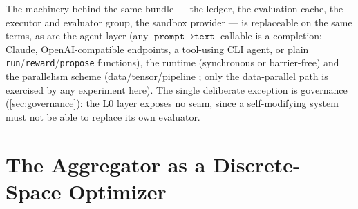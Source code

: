 \documentclass{article}
\newcommand{\code}[1]{\texttt{#1}}
\begin{document}
The machinery behind the same bundle --- the ledger, the evaluation cache, the executor and evaluator group, the sandbox provider --- is replaceable on the same terms, as are the agent layer (any $\code{prompt} \to \code{text}$ callable is a completion: Claude, OpenAI-compatible endpoints, a tool-using CLI agent, or plain \code{run}/\code{reward}/\code{propose} functions), the runtime (synchronous or barrier-free) and the parallelism scheme (data/tensor/pipeline \citep{shoeybi2019megatron,huang2019gpipe}; only the data-parallel path is exercised by any experiment here). The single deliberate exception is governance (\cref{sec:governance}): the L0 layer exposes no seam, since a self-modifying system must not be able to replace its own evaluator.

\section{The Aggregator as a Discrete-Space Optimizer}
\label{sec:aggregator}
\end{document}
